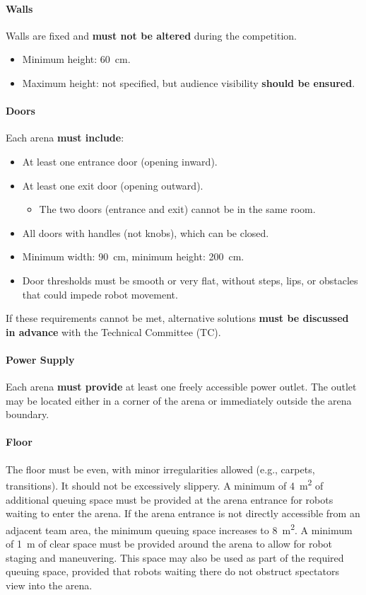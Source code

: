 \paragraph{Walls}
Walls are fixed and \textbf{must not be altered} during the competition.
\begin{itemize}
    \item Minimum height: \qty{60}{\centi\metre}.
    \item Maximum height: not specified, but audience visibility \textbf{should be ensured}.
\end{itemize}

\paragraph{Doors}
Each arena \textbf{must include}:
\begin{itemize}
    \item At least one entrance door (opening inward).
    \item At least one exit door (opening outward).
        \begin{itemize}
            \item The two doors (entrance and exit) cannot be in the same room.
        \end{itemize}
    \item All doors with handles (not knobs), which can be closed.
    \item Minimum width: \qty{90}{\centi\metre}, minimum height: \qty{200}{\centi\metre}.
    \item Door thresholds must be smooth or very flat, without steps, lips, or obstacles that could impede robot movement.
\end{itemize}
If these requirements cannot be met, alternative solutions \textbf{must be discussed in advance} with the Technical Committee (TC).

\paragraph{Power Supply}
Each arena \textbf{must provide} at least one freely accessible power outlet.
The outlet may be located either in a corner of the arena or immediately outside the arena boundary.

\paragraph{Floor}
The floor must be even, with minor irregularities allowed (e.g., carpets, transitions). It should not be excessively slippery.
A minimum of \qty{4}{\meter\squared} of additional queuing space must be provided at the arena entrance for robots waiting to enter the arena. If the arena entrance is not directly accessible from an adjacent team area, the minimum queuing space increases to \qty{8}{\meter\squared}.
A minimum of \qty{1}{\metre} of clear space must be provided around the arena to allow for robot staging and maneuvering. This space may also be used as part of the required queuing space, provided that robots waiting there do not obstruct spectators view into the arena.


